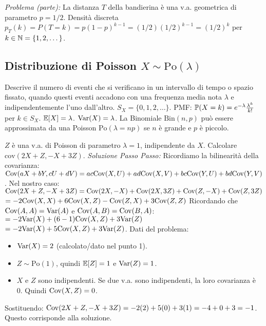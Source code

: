 \documentclass[12pt,a4paper]{article}
\begin{document}
\begin{example}
\begin{example}
\textit{Problema (parte):} La distanza $T$ della bandierina è una v.a. geometrica di parametro $p=1/2$. Densità discreta $p_T(k) = P(T=k) = p(1-p)^{k-1} = (1/2)(1/2)^{k-1} = (1/2)^k$ per $k \in \mathbb{N} = \{1, 2, \dots\}$.
\end{example}

\subsection{Distribuzione di Poisson \texorpdfstring{$X \sim \text{Po}(\lambda)$}{X ~ Po(lambda)}}
Descrive il numero di eventi che si verificano in un intervallo di tempo o spazio fissato, quando questi eventi accadono con una frequenza media nota $\lambda$ e indipendentemente l'uno dall'altro.
$S_X = \{0, 1, 2, \dots\}$.
PMF: $\mathbb{P}(X=k) = e^{-\lambda} \frac{\lambda^k}{k!}$ per $k \in S_X$.
$\mathbb{E}[X] = \lambda$.
$\mathrm{Var}(X) = \lambda$.
La Binomiale $\text{Bin}(n,p)$ può essere approssimata da una Poisson $\text{Po}(\lambda=np)$ se $n$ è grande e $p$ è piccolo.

\begin{example}
$Z$ è una v.a. di Poisson di parametro $\lambda=1$, indipendente da $X$.
Calcolare $\text{cov}(2X+Z, -X+3Z)$.
\textit{Soluzione Passo Passo:}
Ricordiamo la bilinearità della covarianza:
$\mathrm{Cov}(aX+bY, cU+dV) = ac \mathrm{Cov}(X,U) + ad \mathrm{Cov}(X,V) + bc \mathrm{Cov}(Y,U) + bd \mathrm{Cov}(Y,V)$.
Nel nostro caso:
$\mathrm{Cov}(2X+Z, -X+3Z) = \mathrm{Cov}(2X, -X) + \mathrm{Cov}(2X, 3Z) + \mathrm{Cov}(Z, -X) + \mathrm{Cov}(Z, 3Z)$
$= -2 \mathrm{Cov}(X,X) + 6 \mathrm{Cov}(X,Z) - \mathrm{Cov}(Z,X) + 3 \mathrm{Cov}(Z,Z)$
Ricordando che $\mathrm{Cov}(A,A) = \mathrm{Var}(A)$ e $\mathrm{Cov}(A,B) = \mathrm{Cov}(B,A)$:
$= -2 \mathrm{Var}(X) + (6-1) \mathrm{Cov}(X,Z) + 3 \mathrm{Var}(Z)$
$= -2 \mathrm{Var}(X) + 5 \mathrm{Cov}(X,Z) + 3 \mathrm{Var}(Z)$.
Dati del problema:
\begin{itemize}
    \item $\mathrm{Var}(X) = 2$ (calcolato/dato nel punto 1).
    \item $Z \sim \text{Po}(1)$, quindi $\mathbb{E}[Z]=1$ e $\mathrm{Var}(Z)=1$.
    \item $X$ e $Z$ sono indipendenti. Se due v.a. sono indipendenti, la loro covarianza è 0. Quindi $\mathrm{Cov}(X,Z)=0$.
\end{itemize}
Sostituendo:
$\mathrm{Cov}(2X+Z, -X+3Z) = -2(2) + 5(0) + 3(1) = -4 + 0 + 3 = -1$.
Questo corrisponde alla soluzione.
\end{example}


\end{example}
\end{document}

